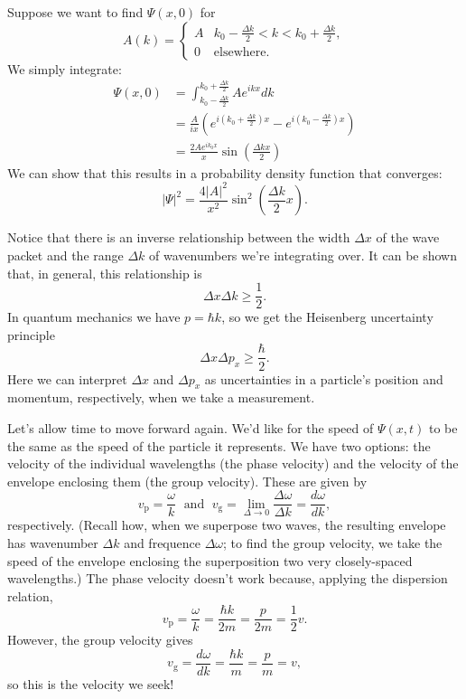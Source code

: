 \documentclass[../p052main.tex]{subfiles}
\begin{document}
\begin{example}
    Suppose we want to find $\Psi(x,0)$ for
    \[ A(k) = \begin{cases} A & k_0 - \frac{\Delta k}{2} < k < k_0 + \frac{\Delta k}{2}, \\ 0 & \text{elsewhere}. \end{cases} \]
    We simply integrate:
    \begin{align*}
        \Psi(x,0) &= \int_{k_0 - \frac{\Delta k}{2}}^{k_0 + \frac{\Delta k}{2}} Ae^{ikx}dk \\
        &= \frac{A}{ix} \left( e^{i(k_0 + \frac{\Delta k}{2})x} - e^{i(k_0 - \frac{\Delta k}{2})x} \right) \\
        &= \frac{2Ae^{ik_0x}}{x} \sin\left( \frac{\Delta k x}{2} \right)
    \end{align*}
    We can show that this results in a probability density function that converges:
    \[ |\Psi|^2 = \frac{4|A|^2}{x^2} \sin^2 \left( \frac{\Delta k}{2}x \right). \]
\end{example}

Notice that there is an inverse relationship between the width $\Delta x$ of the wave packet and the range $\Delta k$ of wavenumbers we're integrating over.
It can be shown that, in general, this relationship is
\[ \Delta x \Delta k \geq \frac{1}{2}. \]
In quantum mechanics we have $p = \hbar k$, so we get the Heisenberg uncertainty principle
\[ \Delta x \Delta p_x \geq \frac{\hbar}{2}. \]
Here we can interpret $\Delta x$ and $\Delta p_x$ as uncertainties in a particle's position and momentum, respectively, when we take a measurement.

Let's allow time to move forward again.
We'd like for the speed of $\Psi(x,t)$ to be the same as the speed of the particle it represents.
We have two options: the velocity of the individual wavelengths (the phase velocity) and the velocity of the envelope enclosing them (the group velocity).
These are given by
\[ v_\textrm{p} = \frac{\omega}{k} \;\text{ and }\; v_\textrm{g} = \lim_{\Delta \to 0} \frac{\Delta \omega}{\Delta k} = \frac{d\omega}{dk}, \]
respectively.
(Recall how, when we superpose two waves, the resulting envelope has wavenumber $\Delta k$ and frequence $\Delta \omega$; to find the group velocity, we take the speed of the envelope enclosing the superposition two very closely-spaced wavelengths.)
The phase velocity doesn't work because, applying the dispersion relation,
\[ v_\textrm{p} = \frac{\omega}{k} = \frac{\hbar k}{2m} = \frac{p}{2m} = \frac{1}{2}v. \]
However, the group velocity gives
\[ v_\textrm{g} = \frac{d\omega}{dk} = \frac{\hbar k}{m} = \frac{p}{m} = v, \]
so this is the velocity we seek!
\end{document}
